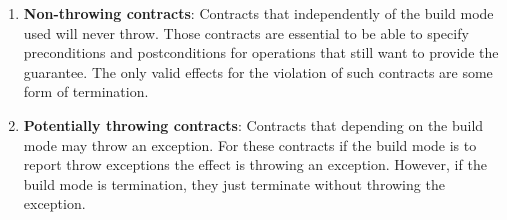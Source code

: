\begin{enumerate}

  \item \textbf{Non-throwing contracts}: Contracts that independently of the
build mode used will never throw. Those contracts are essential to be able to
specify preconditions and postconditions for operations that still want to
provide the  guarantee. The only valid effects for the
violation of such contracts are some form of termination.

  \item \textbf{Potentially throwing contracts}: Contracts that depending on the
build mode may throw an exception. For these contracts if the build mode is to
report throw exceptions the effect is throwing an exception. However, if the
build mode is termination, they just terminate without throwing the exception.

\end{enumerate}
